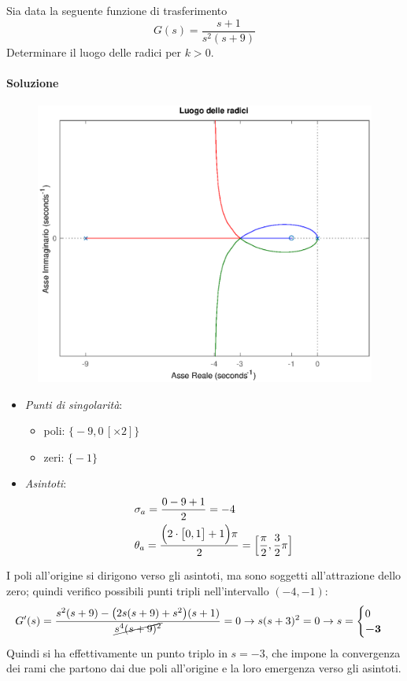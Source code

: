 \begin{esercizio}
Sia data la seguente funzione di trasferimento
\[
	G(s) = \frac{s+1}{s^2 (s+9)}
\]
Determinare il luogo delle radici per \(k>0\).

\paragraph{Soluzione}

\begin{figure}[ht]
	\centering
	\includegraphics[scale=.6]{mod1/assets/rl_ex36}
\end{figure}

\begin{itemize}
	\item \emph{Punti di singolarità}:
		\begin{itemize}
			\item poli: \(\bigl\{ -9, 0\,[\times 2] \bigr\}\)
			\item zeri: \(\bigl\{ -1 \bigr\}\)
		\end{itemize}
	\item \emph{Asintoti}:
		\begin{align*}
			& \sigma_a = \frac{0-9+1}{2} = -4 \\
			& \theta_a = \frac{\Bigl(2 \cdot \bigl[ 0,1 \bigr] +1\Bigr) \pi}{2} = \Bigl[ \frac{\pi}{2}, \frac{3}{2}\pi \Bigr]
		\end{align*}
\end{itemize}
I poli all'origine si dirigono verso gli asintoti, ma sono soggetti all'attrazione
dello zero; quindi verifico possibili punti tripli nell'intervallo \((-4,-1)\):
\[
	G^\prime(s) = \frac{s^2(s+9) -\bigl(2s(s+9)+s^2\bigr)(s+1)}{\cancel{s^4 (s+9)^2}} = 0
	\rightarrow s(s+3)^2 = 0 \rightarrow s = \begin{cases} 0 \\ \bm{-3} \end{cases}
\]
Quindi si ha effettivamente un punto triplo in \(s = -3\), che impone la convergenza
dei rami che partono dai due poli all'origine e la loro emergenza verso gli asintoti.
\end{esercizio}

